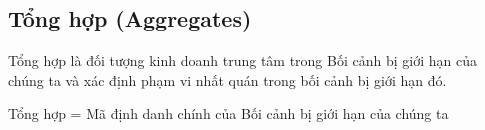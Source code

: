 
\subsection{Tổng hợp  (Aggregates)}


Tổng hợp là đối tượng kinh doanh trung tâm trong Bối cảnh bị giới hạn của chúng ta và xác định phạm vi nhất quán trong bối cảnh bị giới hạn đó.

Tổng hợp = Mã định danh chính của Bối cảnh bị giới hạn của chúng ta






